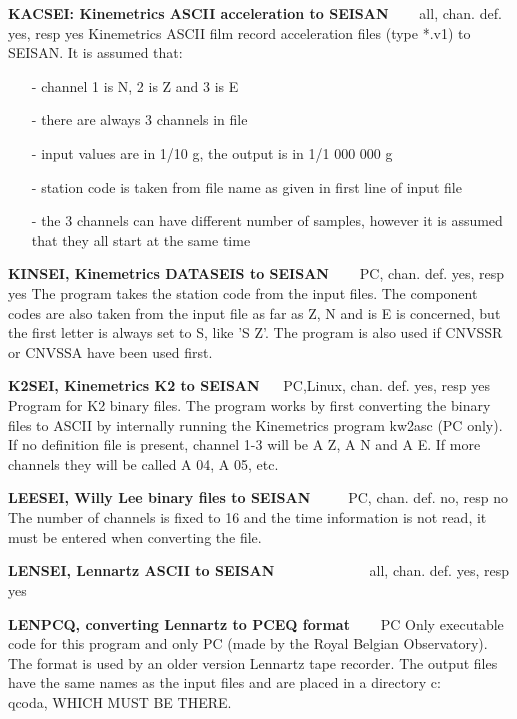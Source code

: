 \textbf{KACSEI: Kinemetrics ASCII acceleration to SEISAN} \verb|   | all, chan. def. yes, resp yes 
\newline
{}
Kinemetrics ASCII film record acceleration files (type *.v1) to SEISAN. It is assumed that: 
\begin{itemize}
\item[-]
channel 1 is N, 2 is Z and 3 is E 
\item[-]
there are always 3 channels in file 
\item[-]
input values are in 1/10 g, the output is in 1/1 000 000 g 
\item[-]
station code is taken from file name as given in first line of input file 
\item[-]
the 3 channels can have different number of samples, however it is 
assumed that they all start at the same time 
\end{itemize}


\textbf{KINSEI, Kinemetrics DATASEIS to SEISAN} \verb|   | PC, chan. def. yes, resp yes \newline
The program takes the station code from the input files. The component codes are also taken from the input file as far as Z, N and is E is concerned, but the first letter is always set to S, like 'S  Z'. The program is also used if CNVSSR or CNVSSA have been used first.  

\textbf{K2SEI, Kinemetrics K2 to SEISAN} \verb|  | PC,Linux, chan. def. yes, resp yes \newline
{}
Program for K2 binary files. The program works by first converting the binary files to ASCII by internally running the Kinemetrics program kw2asc (PC only). If no definition file is present, channel 1-3 will be A Z, A N and A E. If more channels they will be called A 04, A 05, etc. 

\textbf{LEESEI, Willy Lee binary files to SEISAN} \verb|    | PC, chan. def. no, resp no\newline
The number of channels is fixed to 16 and the time information is not read, it must be entered when converting the file. 

\textbf{LENSEI, Lennartz ASCII to SEISAN} \verb|            | all, chan. def. yes, resp yes\newline
{}

\textbf{LENPCQ, converting Lennartz to PCEQ format} \verb|   | PC\newline
{} 
Only executable code for this program and only PC (made by the Royal Belgian Observatory). The format is used by an older version Lennartz tape recorder. The output files have the same names as the input files and are placed in a directory c:\\qcoda, WHICH MUST BE THERE. 

